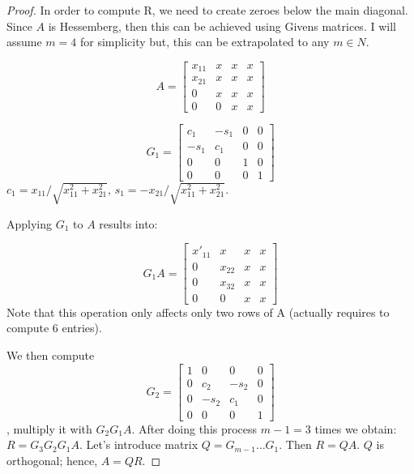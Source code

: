\documentclass[10pt]{article}
\begin{document}
\begin{proof}
  In order to compute R, we need to create zeroes below the main diagonal. Since $A$ is Hessemberg, then
this can be achieved using Givens matrices. I will assume $m=4$ for simplicity but, this can be 
extrapolated to any $m\in N$.

  \[
    A =  \begin{bmatrix}
            x_{11}  & x & x & x \\
            x_{21}  & x & x & x \\
            0       & x & x & x \\
            0       & 0 & x & x 
            \end{bmatrix}
  \]

  \[
    G_1 =  \begin{bmatrix}
            c_1  &-s_1 & 0 & 0 \\
           -s_1  & c_1 & 0 & 0 \\
            0    & 0   & 1 & 0 \\
            0    & 0   & 0 & 1 
            \end{bmatrix}
  \]
$c_1 = x_{11}/\sqrt{x_{11}^2 + x_{21}^2}$, $s_1= -x_{21}/\sqrt{x_{11}^2 + x_{21}^2}$.


Applying $G_1$ to $A$ results into:

\[
  G_1A =  
            \begin{bmatrix}
            x'_{11}  & x      & x & x \\
            0        & x_{22} & x & x \\
            0        & x_{32} & x & x \\
            0        & 0      & x & x 
            \end{bmatrix}
\]
Note that this operation only affects only two rows of A (actually requires to compute 6 entries).

We then compute
  \[
    G_2 =  \begin{bmatrix}
            1    & 0   & 0   & 0 \\
            0    & c_2 &-s_2 & 0 \\
            0    &-s_2 & c_1 & 0 \\
            0    & 0   & 0 & 1 
            \end{bmatrix}
  \]
, multiply it with $G_2 G_1 A$. After doing this process $m-1=3$ times
 we obtain:
$R = G_3 G_2 G_1 A$. Let's introduce matrix $Q = G_{m-1} \dots G_1$. Then $R = Q A$. $Q$ is orthogonal; hence,
$A = QR$.


\end{proof}
\end{document}

